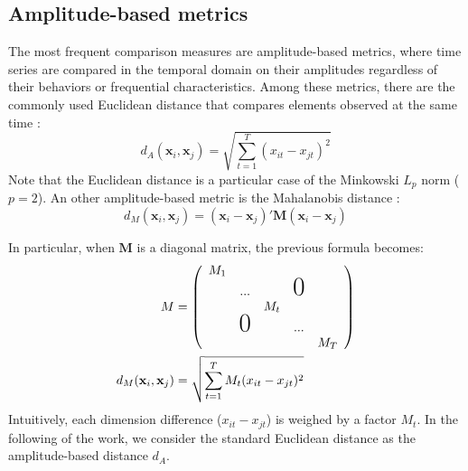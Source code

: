 \subsection{Amplitude-based metrics}
\label{sec:TSmetrics}

The most frequent comparison measures are amplitude-based metrics, where time series are compared in the temporal domain on their amplitudes regardless of their behaviors or frequential characteristics. Among these metrics, there are the commonly used Euclidean distance that compares elements observed at the same time \cite{Ding2008}: 
\begin{equation}	
	d_A(\textbf{x}_i,\textbf{x}_j) = \sqrt{\sum\limits_{t=1}^{T} (x_{it}-x_{jt})^2}
\label{eq:A}
\end{equation}
Note that the Euclidean distance is a particular case of the Minkowski $L_p$ norm ($p=2$). An other amplitude-based metric is the Mahalanobis distance \cite{Prekopcsak2012}:
\begin{equation}	
	d_M(\textbf{x}_i,\textbf{x}_j) = (\textbf{x}_i-\textbf{x}_j)'\textbf{M}(\textbf{x}_i-\textbf{x}_j)
	\label{eq:dM}
\end{equation}

\noindent In particular, when $\textbf{M}$ is a diagonal matrix, the previous formula becomes: 
\begin{align}
M &= 
	\left(
	\begin{array}{ccccc}
	M_1\\
	& ... & & \text{\huge0}\\
	& & M_t & &\\
	& \text{\huge0} & & ... \\
	& & & & M_T
	\end{array}
	\right)	\\
d_M(\textbf{x}_i,\textbf{x}_j) & = \sqrt{\sum\limits_{t=1}^{T} M_t(x_{it}-x_{jt})^2}
\label{eq:dM2}
\end{align}
Intuitively, each dimension difference ($x_{it}-x_{jt}$) is weighed by a factor $M_t$. In the following of the work, we consider the standard Euclidean distance as the amplitude-based distance $d_A$.

